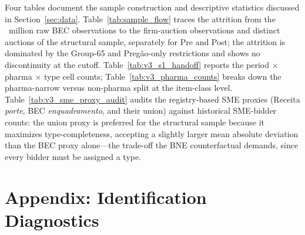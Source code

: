 Four tables document the sample construction and descriptive statistics discussed in Section~\ref{sec:data}. Table~\ref{tab:sample_flow} traces the attrition from the \nBidsRaw{}~million raw BEC observations to the \nObsAuctions{} firm-auction observations and \nDistinctAuctions{} distinct auctions of the structural sample, separately for Pre and Post; the attrition is dominated by the Group-65 and Preg\~ao-only restrictions and shows no discontinuity at the \policyCutoffMonth{} cutoff. Table~\ref{tab:v3_s1_handoff} reports the period $\times$ pharma $\times$ type cell counts; Table~\ref{tab:v3_pharma_counts} breaks down the pharma-narrow versus non-pharma split at the item-class level. Table~\ref{tab:v3_sme_proxy_audit} audits the registry-based SME proxies (Receita \emph{porte}, BEC \emph{enquadramento}, and their union) against historical SME-bidder counts: the union proxy is preferred for the structural sample because it maximizes type-completeness, accepting a slightly larger mean absolute deviation than the BEC proxy alone---the trade-off the BNE counterfactual demands, since every bidder must be assigned a type.






\section{Appendix: Identification Diagnostics}\label{app:id}

